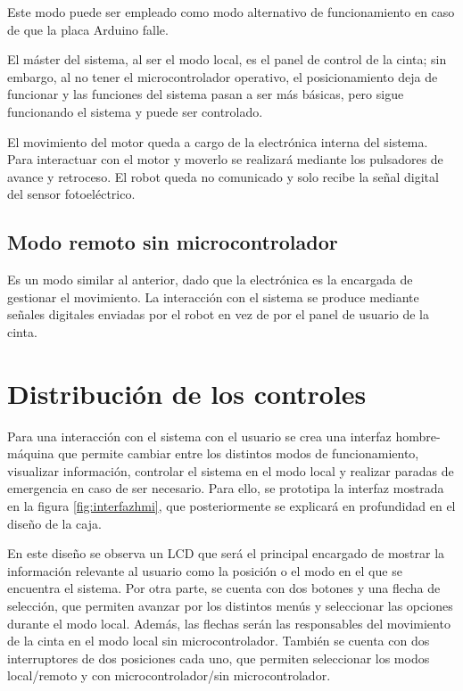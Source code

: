 Este modo puede ser empleado como modo alternativo de funcionamiento en caso de que la placa Arduino falle.

El máster del sistema, al ser el modo local, es el panel de control de la cinta; sin embargo, al no tener el microcontrolador operativo, el posicionamiento deja de funcionar y las funciones del sistema pasan a ser más básicas, pero sigue funcionando el sistema y puede ser controlado.

El movimiento del motor queda a cargo de la electrónica interna del sistema. Para interactuar con el motor y moverlo se realizará mediante los pulsadores de avance y retroceso. El robot queda no comunicado y solo recibe la señal digital del sensor fotoeléctrico.


\subsection{Modo remoto sin microcontrolador}\label{subsec-04}

Es un modo similar al anterior, dado que la electrónica es la encargada de gestionar el movimiento. La interacción con el sistema se produce mediante señales digitales enviadas por el robot en vez de por el panel de usuario de la cinta.

\section{Distribución de los controles}

Para una interacción con el sistema con el usuario se crea una interfaz hombre-máquina que permite cambiar entre los distintos modos de funcionamiento, visualizar información, controlar el sistema en el modo local y realizar paradas de emergencia en caso de ser necesario. Para ello, se prototipa la interfaz mostrada en la figura 
\ref{fig:interfazhmi}, que posteriormente se explicará en profundidad en el diseño de la caja.

En este diseño se observa un LCD que será el principal encargado de mostrar la información relevante al usuario como la posición o el modo en el que se encuentra el sistema. Por otra parte, se cuenta con dos botones y una flecha de selección, que permiten avanzar por los distintos menús y seleccionar las opciones durante el modo local. Además, las flechas serán las responsables del movimiento de la cinta en el modo local sin microcontrolador. También se cuenta con dos interruptores de dos posiciones cada uno, que permiten seleccionar los modos local/remoto y con microcontrolador/sin microcontrolador.

